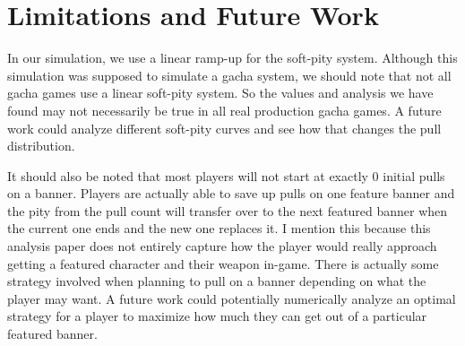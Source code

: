 \documentclass[11pt]{article}
\begin{document}
\section{Limitations and Future Work}

In our simulation, we use a linear ramp-up for the soft-pity system. Although this
simulation was supposed to simulate a gacha system, we should note that not all
gacha games use a linear soft-pity system. So the values and analysis we have found
may not necessarily be true in all real production gacha games. A future work
could analyze different soft-pity curves and see how that changes the pull distribution.

It should also be noted that most players will not start at exactly 0 initial pulls on a banner.
Players are actually able to save up pulls on one feature banner and the pity from the pull count
will transfer over to the next featured banner when the current one ends and the new one replaces it.
I mention this because this analysis paper does not entirely capture how the player would really approach
getting a featured character and their weapon in-game. There is actually some strategy involved
when planning to pull on a banner depending on what the player may want. A future work could
potentially numerically analyze an optimal strategy for a player to maximize how much they can get
out of a particular featured banner.
\end{document}
